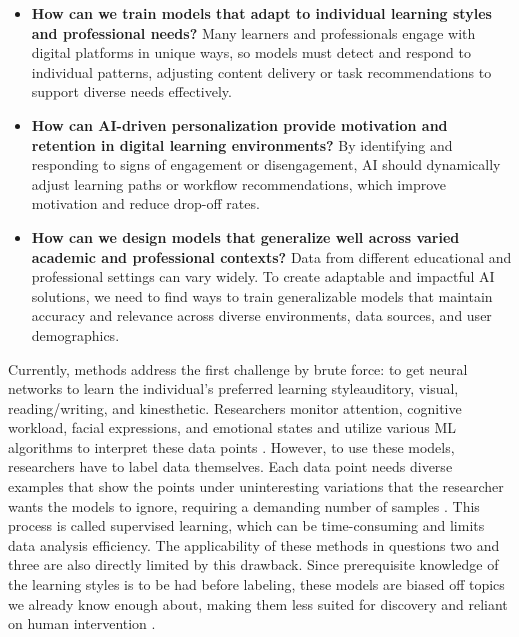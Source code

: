 \documentclass{article}
\begin{document}
\begin{itemize}
    \item \textbf{How can we train models that adapt to individual learning styles and professional needs?} \newline 
    Many learners and professionals engage with digital platforms in unique ways, so models must detect and respond to individual patterns, adjusting content delivery or task recommendations to support diverse needs effectively. 
    \item \textbf{How can AI-driven personalization provide motivation and retention in digital learning environments?} \newline 
    By identifying and responding to signs of engagement or disengagement, AI should dynamically adjust learning paths or workflow recommendations, which improve motivation and reduce drop-off rates. 
    \item \textbf{How can we design models that generalize well across varied academic and professional contexts?} \newline 
    Data from different educational and professional settings can vary widely. To create adaptable and impactful AI solutions, we need to find ways to train generalizable models that maintain accuracy and relevance across diverse environments, data sources, and user demographics. 
\end{itemize}

\indent Currently, methods address the first challenge by brute force: to get neural networks to learn the individual's preferred learning style\textemdash auditory, visual, reading/writing, and kinesthetic. Researchers monitor attention, cognitive workload, facial expressions, and emotional states and utilize various ML algorithms to interpret these data points \cite{An-AI-based-learning-style-prediction-model-for-personalized-and-effective-learning}. However, to use these models, researchers have to label data themselves. Each data point needs diverse examples that show the points under uninteresting variations that the researcher wants the models to ignore, requiring a demanding number of samples \cite{Deep-learning-is-combined-with-massive-scale-citizen-science}. This process is called supervised learning, which can be time-consuming and limits data analysis efficiency. The applicability of these methods in questions two and three are also directly limited by this drawback. Since prerequisite knowledge of the learning styles is to be had before labeling, these models are biased off topics we already know enough about, making them less suited for discovery and reliant on human intervention \cite{Supervised-learning-with-decision-tree-based-methods-in-computational-and-systems-biology}.
\end{document}
